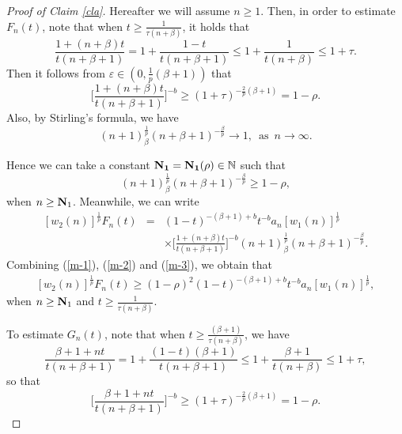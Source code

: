 \documentclass[10pt]{amsart}
\theoremstyle{definition}
\theoremstyle{question}
\numberwithin{equation}{section}
\begin{document}
\begin{proof}[Proof of Claim \ref{cla}]
Hereafter we will assume $n\geq 1$. Then, in order to estimate $F_n(t)$, note that when $t\geq \frac{1}{\tau(n+\beta)}$, it holds that 
\begin{equation}
\frac{1+(n+\beta)t}{t(n+\beta+1)}=1+\frac{1-t}{t(n+\beta+1)}\leq 1+\frac{1}{t(n+\beta)}\leq 1+{\tau}.\nonumber 
\end{equation}
Then it follows from $\varepsilon\in (0, \frac{1}{p}(\beta+1))$ that 
\begin{equation}\label{m-1}\Big[\frac{1+(n+\beta)t}{t(n+\beta+1)}\Big]^{-b}\geq (1+{\tau})^{-\frac{2}{p}(\beta+1)}=1-\rho.\end{equation}
Also, by Stirling's formula, we have  
\begin{equation} (n+1)_{\beta}^{\frac{1}{p}}(n+\beta+1)^{-\frac{\beta}{p}}\rightarrow 1,\,\,\, {\text{as}}\,\,\, n\rightarrow \infty. \nonumber 
\end{equation}

Hence we can take a constant $\bf{N}_1=\bf{N}_1(\rho)\in \mathbb{N}$ such that  
\begin{equation}\label{m-2}
 (n+1)_{\beta}^{\frac{1}{p}}(n+\beta+1)^{-\frac{\beta}{p}}\geq 1-\rho,
\end{equation}
when $n\geq {\bf{N}}_1$. 
Meanwhile, we can write
\begin{eqnarray}\label{m-3}
[w_2(n)]^{\frac{1}{p}}F_n(t)&=&(1-t)^{-(\beta+1)+b}t^{-b}a_n[w_1(n)]^{\frac{1}{p}}\nonumber \\
&& \times \Big[\frac{1+(n+\beta)t}{t(n+\beta+1)}\Big]^{-b} (n+1)_{\beta}^{\frac{1}{p}}(n+\beta+1)^{-\frac{\beta}{p}}.  
\end{eqnarray}
Combining (\ref{m-1}), (\ref{m-2}) and (\ref{m-3}), we obtain that 
\begin{eqnarray}\label{e-3} 
[w_2(n)]^{\frac{1}{p}}F_n(t)\geq (1-\rho)^2(1-t)^{-(\beta+1)+b}t^{-b}a_n[w_1(n)]^{\frac{1}{p}},
\end{eqnarray}
when $n\geq {\bf{N}}_1$ and $t\geq \frac{1}{\tau(n+\beta)}$.

To estimate $G_n(t)$, note that when $t\geq \frac{(\beta+1)}{\tau(n+\beta)}$, we have  
\begin{equation}
\frac{\beta+1+nt}{t(n+\beta+1)}=1+\frac{(1-t)(\beta+1)}{t(n+\beta+1)}\leq 1+\frac{\beta+1}{t(n+\beta)}\leq 1+{\tau}, \nonumber 
\end{equation}
so that 
\begin{equation}\label{n-2} \Big[\frac{\beta+1+nt}{t(n+\beta+1)}\Big]^{-b}\geq (1+{\tau})^{-\frac{2}{p}(\beta+1)}=1-\rho.\end{equation}


\end{proof}
\end{document}

